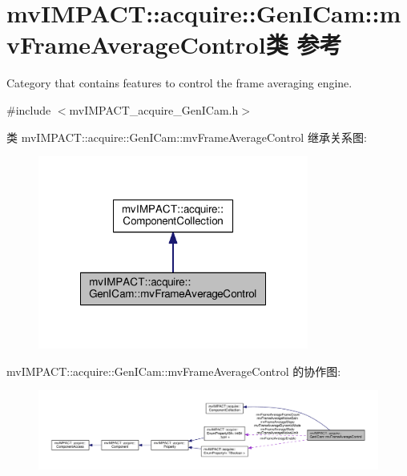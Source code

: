 \hypertarget{classmv_i_m_p_a_c_t_1_1acquire_1_1_gen_i_cam_1_1mv_frame_average_control}{\section{mv\+I\+M\+P\+A\+C\+T\+:\+:acquire\+:\+:Gen\+I\+Cam\+:\+:mv\+Frame\+Average\+Control类 参考}
\label{classmv_i_m_p_a_c_t_1_1acquire_1_1_gen_i_cam_1_1mv_frame_average_control}
}


Category that contains features to control the frame averaging engine.  




{\ttfamily \#include $<$mv\+I\+M\+P\+A\+C\+T\+\_\+acquire\+\_\+\+Gen\+I\+Cam.\+h$>$}



类 mv\+I\+M\+P\+A\+C\+T\+:\+:acquire\+:\+:Gen\+I\+Cam\+:\+:mv\+Frame\+Average\+Control 继承关系图\+:
\nopagebreak
\begin{figure}[H]
\begin{center}
\leavevmode
\includegraphics[width=252pt]{classmv_i_m_p_a_c_t_1_1acquire_1_1_gen_i_cam_1_1mv_frame_average_control__inherit__graph}
\end{center}
\end{figure}


mv\+I\+M\+P\+A\+C\+T\+:\+:acquire\+:\+:Gen\+I\+Cam\+:\+:mv\+Frame\+Average\+Control 的协作图\+:
\nopagebreak
\begin{figure}[H]
\begin{center}
\leavevmode
\includegraphics[width=350pt]{classmv_i_m_p_a_c_t_1_1acquire_1_1_gen_i_cam_1_1mv_frame_average_control__coll__graph}
\end{center}
\end{figure}
